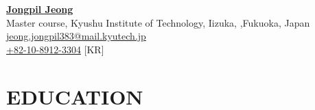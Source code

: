 \documentclass[a4paper,9pt]{extarticle}
\begin{document}
\pagestyle{fancy}
\renewcommand{\headrulewidth}{0pt}
\fancyhead{}
\thispagestyle{empty} %

\begin{flushleft}
\href{https://scholar.google.com/citations?user=O-3pYeQAAAAJ&hl=en}{\textbf{\LARGE Jongpil Jeong}}\\[2pt] %
Master course, Kyushu Institute of Technology, Iizuka, ,Fukuoka, Japan
\\ \href{mailto:jeong.jongpil383@mail.kyutech.jp}{jeong.jongpil383@mail.kyutech.jp} %
\\ \href{tel:+82-10-8912-3304}{+82-10-8912-3304} [KR]
\end{flushleft} 



\section*{EDUCATION}
\end{document}
